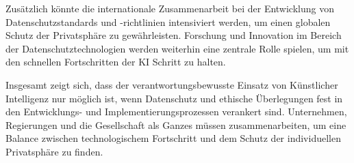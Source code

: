 Zusätzlich könnte die internationale Zusammenarbeit bei der Entwicklung von
Datenschutzstandards und -richtlinien intensiviert werden, um einen globalen
Schutz der Privatsphäre zu gewährleisten. Forschung und Innovation im Bereich
der Datenschutztechnologien werden weiterhin eine zentrale Rolle spielen, um mit
den schnellen Fortschritten der KI Schritt zu halten.

Insgesamt zeigt sich, dass der verantwortungsbewusste Einsatz von Künstlicher
Intelligenz nur möglich ist, wenn Datenschutz und ethische Überlegungen fest in
den Entwicklungs- und Implementierungsprozessen verankert sind. Unternehmen,
Regierungen und die Gesellschaft als Ganzes müssen zusammenarbeiten, um eine
Balance zwischen technologischem Fortschritt und dem Schutz der individuellen
Privatsphäre zu finden.

